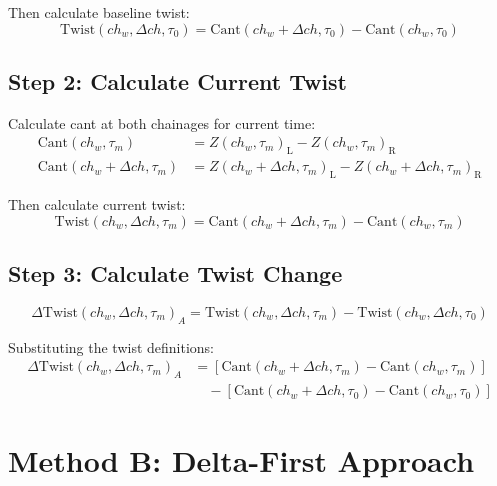\documentclass{article}
\newcommand{\chainage}[1]{ch_{#1}}
\newcommand{\time}[1]{\tau_{#1}}
\newcommand{\Left}{\text{L}}
\newcommand{\Right}{\text{R}}
\newcommand{\Z}[3]{Z(#1, #2)_{#3}}
\newcommand{\Cant}[2]{\text{Cant}(#1, #2)}
\newcommand{\Twist}[3]{\text{Twist}(#1, #2, #3)}
\newcommand{\DTwist}[3]{\Delta\text{Twist}(#1, #2, #3)}
\begin{document}
Then calculate baseline twist:
\begin{equation}
\Twist{\chainage{w}}{\Delta ch}{\time{0}} = \Cant{\chainage{w} + \Delta ch}{\time{0}} - \Cant{\chainage{w}}{\time{0}}
\end{equation}

\subsection{Step 2: Calculate Current Twist}
Calculate cant at both chainages for current time:
\begin{align}
\Cant{\chainage{w}}{\time{m}} &= \Z{\chainage{w}}{\time{m}}{\Left} - \Z{\chainage{w}}{\time{m}}{\Right} \\
\Cant{\chainage{w} + \Delta ch}{\time{m}} &= \Z{\chainage{w} + \Delta ch}{\time{m}}{\Left} - \Z{\chainage{w} + \Delta ch}{\time{m}}{\Right}
\end{align}

Then calculate current twist:
\begin{equation}
\Twist{\chainage{w}}{\Delta ch}{\time{m}} = \Cant{\chainage{w} + \Delta ch}{\time{m}} - \Cant{\chainage{w}}{\time{m}}
\end{equation}

\subsection{Step 3: Calculate Twist Change}
\begin{equation}
\DTwist{\chainage{w}}{\Delta ch}{\time{m}}_A = \Twist{\chainage{w}}{\Delta ch}{\time{m}} - \Twist{\chainage{w}}{\Delta ch}{\time{0}}
\end{equation}

Substituting the twist definitions:
\begin{align}
\DTwist{\chainage{w}}{\Delta ch}{\time{m}}_A &= \left[\Cant{\chainage{w} + \Delta ch}{\time{m}} - \Cant{\chainage{w}}{\time{m}}\right] \\
&\quad - \left[\Cant{\chainage{w} + \Delta ch}{\time{0}} - \Cant{\chainage{w}}{\time{0}}\right]
\end{align}

\section{Method B: Delta-First Approach}
\end{document}
